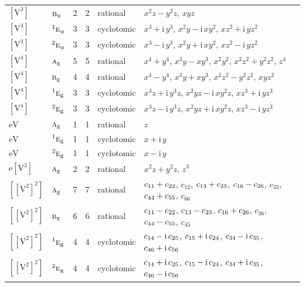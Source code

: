 \documentclass[10pt,a4paper]{article}
\numberwithin{equation}{section}
\newcommand{\irr}[1]{\text{\normalfont\scshape #1}}
\newcommand{\conjpair}[1]{{}^{#1}}
\newcommand{\ptag}[1]{\mathrm{#1}}
\newcommand{\iunit}{\mathrm{i}}
\newcommand{\jahn}[1]{\mathrm{#1}}
\newlength{\fillwidth}\newlength{\cellwidth}\newlength{\colwidth}
\newcommand{\signbreak}{\penalty100\relax}
\begin{document}
{\begin{longtable}{@{}llrrl>{\RaggedRight\arraybackslash}p{\fillwidth}@{}}
$\jahn{[V^{3}]}$ & $\irr{b}_{\ptag{u}}$ & 2 & 2 & rational & $x^{2}z - y^{2}z$, $xyz$\\
$\jahn{[V^{3}]}$ & $\conjpair{1}\irr{e}_{\ptag{u}}$ & 3 & 3 & cyclotomic & $x^{3} + \iunit{}\,y^{3}$, $x^{2}y - \iunit{}\,xy^{2}$, $xz^{2} + \iunit{}\,yz^{2}$\\
$\jahn{[V^{3}]}$ & $\conjpair{2}\irr{e}_{\ptag{u}}$ & 3 & 3 & cyclotomic & $x^{3} - \iunit{}\,y^{3}$, $x^{2}y + \iunit{}\,xy^{2}$, $xz^{2} - \iunit{}\,yz^{2}$\\
$\jahn{[V^{4}]}$ & $\irr{a}_{\ptag{g}}$ & 5 & 5 & rational & $x^{4} + y^{4}$, $x^{3}y - xy^{3}$, $x^{2}y^{2}$, $x^{2}z^{2} + y^{2}z^{2}$, $z^{4}$\\
$\jahn{[V^{4}]}$ & $\irr{b}_{\ptag{g}}$ & 4 & 4 & rational & $x^{4} - y^{4}$, $x^{3}y + xy^{3}$, $x^{2}z^{2} - y^{2}z^{2}$, $xyz^{2}$\\
$\jahn{[V^{4}]}$ & $\conjpair{1}\irr{e}_{\ptag{g}}$ & 3 & 3 & cyclotomic & $x^{3}z + \iunit{}\,y^{3}z$, $x^{2}yz - \iunit{}\,xy^{2}z$, $xz^{3} + \iunit{}\,yz^{3}$\\
$\jahn{[V^{4}]}$ & $\conjpair{2}\irr{e}_{\ptag{g}}$ & 3 & 3 & cyclotomic & $x^{3}z - \iunit{}\,y^{3}z$, $x^{2}yz + \iunit{}\,xy^{2}z$, $xz^{3} - \iunit{}\,yz^{3}$\\
$\jahn{eV}$ & $\irr{a}_{\ptag{g}}$ & 1 & 1 & rational & $z$\\
$\jahn{eV}$ & $\conjpair{1}\irr{e}_{\ptag{g}}$ & 1 & 1 & cyclotomic & $x + \iunit{}\,y$\\
$\jahn{eV}$ & $\conjpair{2}\irr{e}_{\ptag{g}}$ & 1 & 1 & cyclotomic & $x - \iunit{}\,y$\\
$\jahn{e[V^{3}]}$ & $\irr{a}_{\ptag{g}}$ & 2 & 2 & rational & $x^{2}z + y^{2}z$, $z^{3}$\\
$\jahn{[[V^{2}]^{2}]}$ & $\irr{a}_{\ptag{g}}$ & 7 & 7 & rational & $c_{11} +\signbreak c_{22}$, $c_{12}$, $c_{13} +\signbreak c_{23}$, $c_{16} -\signbreak c_{26}$, $c_{33}$, $c_{44} +\signbreak c_{55}$, $c_{66}$\\
$\jahn{[[V^{2}]^{2}]}$ & $\irr{b}_{\ptag{g}}$ & 6 & 6 & rational & $c_{11} -\signbreak c_{22}$, $c_{13} -\signbreak c_{23}$, $c_{16} +\signbreak c_{26}$, $c_{36}$, $c_{44} -\signbreak c_{55}$, $c_{45}$\\
$\jahn{[[V^{2}]^{2}]}$ & $\conjpair{1}\irr{e}_{\ptag{g}}$ & 4 & 4 & cyclotomic & $c_{14} -\signbreak \iunit{}\,c_{25}$, $c_{15} +\signbreak \iunit{}\,c_{24}$, $c_{34} -\signbreak \iunit{}\,c_{35}$, $c_{46} +\signbreak \iunit{}\,c_{56}$\\
$\jahn{[[V^{2}]^{2}]}$ & $\conjpair{2}\irr{e}_{\ptag{g}}$ & 4 & 4 & cyclotomic & $c_{14} +\signbreak \iunit{}\,c_{25}$, $c_{15} -\signbreak \iunit{}\,c_{24}$, $c_{34} +\signbreak \iunit{}\,c_{35}$, $c_{46} -\signbreak \iunit{}\,c_{56}$\\

\end{longtable}}
\end{document}
